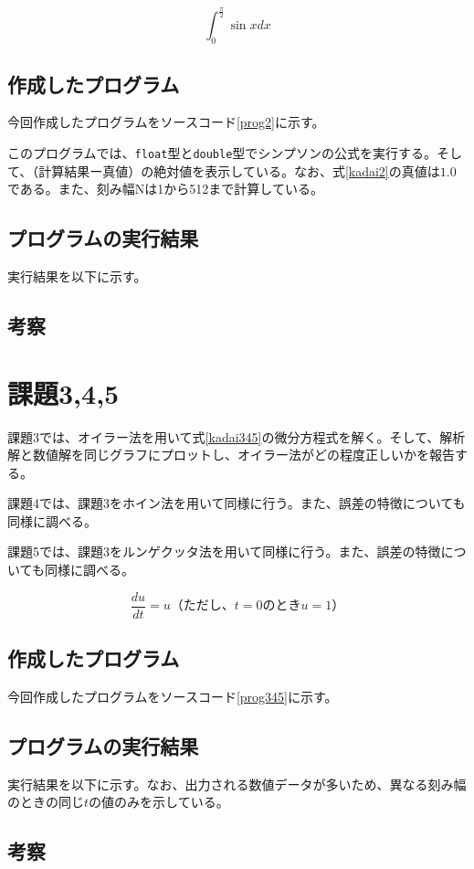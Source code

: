 \documentclass[10pt,titlepage]{jsarticle}
\begin{document}
\begin{equation}
\label{kadai2}
	\int_0^\frac{\pi}{2} \sin x dx
\end{equation}

\subsection{作成したプログラム}
今回作成したプログラムをソースコード\ref{prog2}に示す。



このプログラムでは、{\tt float}型と{\tt double}型でシンプソンの公式を実行する。そして、（計算結果ー真値）の絶対値を表示している。なお、式\ref{kadai2}の真値は$1.0$である。また、刻み幅Nは1から512まで計算している。

\subsection{プログラムの実行結果}
実行結果を以下に示す。
\begin{oframed}
\end{oframed}


\subsection{考察}

\section{課題3,4,5}
課題3では、オイラー法を用いて式\ref{kadai345}の微分方程式を解く。そして、解析解と数値解を同じグラフにプロットし、オイラー法がどの程度正しいかを報告する。

課題4では、課題3をホイン法を用いて同様に行う。また、誤差の特徴についても同様に調べる。

課題5では、課題3をルンゲクッタ法を用いて同様に行う。また、誤差の特徴についても同様に調べる。

\begin{equation}
\label{kadai345}
	\frac{du}{dt} = u （ただし、t=0のときu=1）
\end{equation}

\subsection{作成したプログラム}
今回作成したプログラムをソースコード\ref{prog345}に示す。




\subsection{プログラムの実行結果}
実行結果を以下に示す。なお、出力される数値データが多いため、異なる刻み幅のときの同じ$t$の値のみを示している。
\begin{oframed}
\end{oframed}


\subsection{考察}
\end{document}
